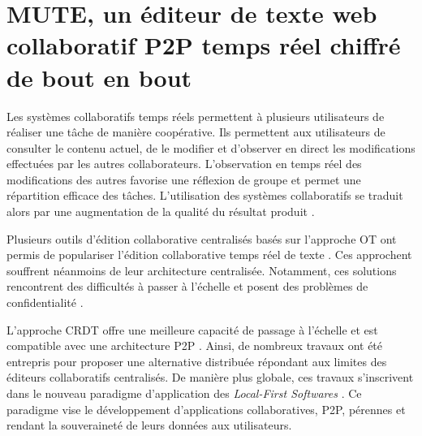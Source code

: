 \NumberThisInToc
\chapter{MUTE, un éditeur de texte web collaboratif P2P temps réel chiffré de bout en bout}
\minitoc

Les systèmes collaboratifs temps réels permettent à plusieurs utilisateurs de réaliser une tâche de manière coopérative.
Ils permettent aux utilisateurs de consulter le contenu actuel, de le modifier et d'observer en direct les modifications effectuées par les autres collaborateurs.
L'observation en temps réel des modifications des autres favorise une réflexion de groupe et permet une répartition efficace des tâches.
L'utilisation des systèmes collaboratifs se traduit alors par une augmentation de la qualité du résultat produit \cite{2004-empirical-study-collaborative-writing, 2005-internet-encyclopaedias-head-to-head}.

Plusieurs outils d'édition collaborative centralisés basés sur l'approche OT ont permis de populariser l'édition collaborative temps réel de texte \cite{gdocs, etherpad}.
Ces approchent souffrent néanmoins de leur architecture centralisée.
Notamment, ces solutions rencontrent des difficultés à passer à l'échelle \cite{2015-cope-delay-collaborative-note-taking-ignat, 2016-performance-collaborative-editors-dang-ignat} et posent des problèmes de confidentialité \cite{prism-washington-post, prism-guardian}.

L'approche \ac{CRDT} offre une meilleure capacité de passage à l'échelle et est compatible avec une architecture \ac{P2P} \cite{2011-evaluation-crdts-ahmed-nacer}.
Ainsi, de nombreux travaux \cite{Nedelec2016CRATE, peerpad, serenity-notes} ont été entrepris pour proposer une alternative distribuée répondant aux limites des éditeurs collaboratifs centralisés.
De manière plus globale, ces travaux s'inscrivent dans le nouveau paradigme d'application des \emph{Local-First Softwares} \cite{localfirstsoftware2019, pushpin2020}.
Ce paradigme vise le développement d'applications collaboratives, \ac{P2P}, pérennes et rendant la souveraineté de leurs données aux utilisateurs.


